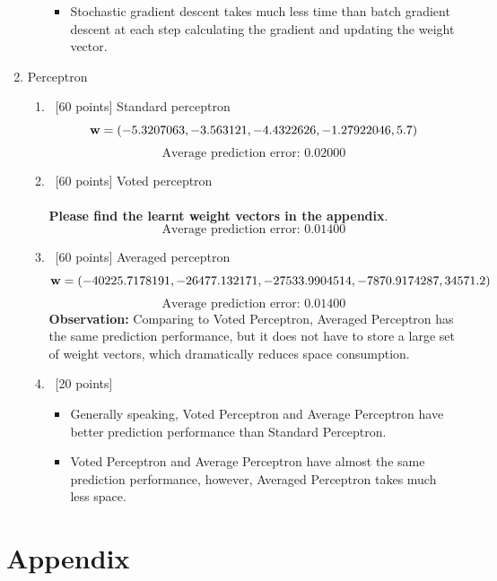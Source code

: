 \documentclass[12pt, fullpage,letterpaper]{article}
\newcommand{\bw}{{\bf w}}
\begin{document}
\begin{enumerate}
\begin{enumerate}
\begin{itemize}
\item Stochastic gradient descent takes much less time than batch gradient descent at each step calculating the gradient and updating the weight vector.
\end{itemize}
\end{enumerate}
\item Perceptron
\begin{enumerate}
\item~[60 points] Standard perceptron
$$\bw=(-5.3207063, -3.563121, -4.4322626, -1.27922046, 5.7)$$
$$\text{Average prediction error: }0.02000$$
\item~[60 points] Voted perceptron\\\\
\textbf{Please find the learnt weight vectors in the appendix}.
$$\text{Average prediction error: }0.01400$$
\item~[60 points] Averaged perceptron
$$\bw=(-40225.7178191, -26477.132171, -27533.9904514, -7870.9174287, 34571.2)$$
$$\text{Average prediction error: }0.01400$$
\textbf{Observation: }Comparing to Voted Perceptron, Averaged Perceptron has the same prediction performance, but it does not have to store a large set of weight vectors, which dramatically reduces space consumption.
\item~[20 points]
\begin{itemize}
\item Generally speaking, Voted Perceptron and Average Perceptron have better prediction performance than Standard Perceptron.
\item Voted Perceptron and Average Perceptron have almost the same prediction performance, however, Averaged Perceptron takes much less space.
\end{itemize}
\end{enumerate}
\end{enumerate}

\newpage
\section{Appendix}
\end{document}
